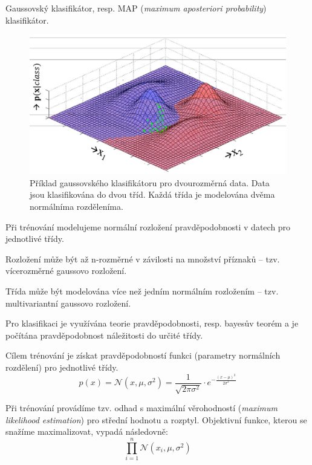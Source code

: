 \begin{compactitem}
    \item Gaussovský klasifikátor, resp. MAP (\textit{maximum aposteriori probability}) klasifikátor.

    \begin{figure}[H]
        \centering
        \includegraphics[width=0.9\linewidth]{gauss_classification.pdf}
        \caption{Příklad gaussovského klasifikátoru pro dvourozměrná data. Data jsou klasifikována do dvou tříd. Každá třída je modelována dvěma normálníma rozděleníma.}
    \end{figure}

    \item Při trénování modelujeme normální rozložení pravděpodobnosti v datech pro jednotlivé třídy. \begin{compactitem}
        \item Rozložení může být až n-rozměrné v závilosti na množství příznaků -- tzv. vícerozměrné gaussovo rozložení.
        \item Třída může být modelována více než jedním normálním rozložením -- tzv. multivariantní gaussovo rozložení.
    \end{compactitem}

    \item Pro klasifikaci je využívána teorie pravděpodobnosti, resp. bayesův teorém a je počítána pravděpodobnost náležitosti do určité třídy.

    \item Cílem trénování je získat pravděpodobností funkci (parametry normálních rozdělení) pro jednotlivé třídy.
    $${\displaystyle p(x) = \mathcal{N}(x, \mu, \sigma^2) = \frac{1}{\sqrt{2 \pi \sigma^2}} \cdot e^{- \frac{(x - \mu)^2}{2 \sigma^2}} }$$

    \item Při trénování provádíme tzv. odhad s maximální věrohodností (\textit{maximum likelihood estimation}) pro střední hodnotu a rozptyl. Objektivní funkce, kterou se snažíme maximalizovat, vypadá následovně:
    $$ {\displaystyle \prod_{i=1}^{n} \mathcal{N}(x_i, \mu, \sigma^2)} $$


\end{compactitem}

